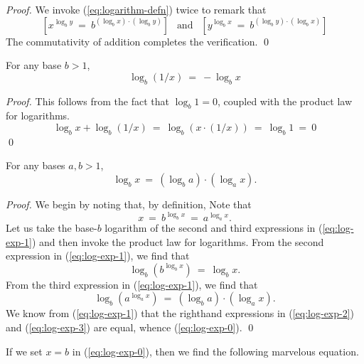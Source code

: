 \begin{proof}
We invoke (\ref{eq:logarithm-defn}) twice to remark that
\[ \left[x^{\log_b y} \ = \ b^{(\log_b x) \cdot (\log_b y)}\right]
\ \ \mbox{ and } \ \ 
\left[y^{\log_b x}\ = \ b^{(\log_b y) \cdot (\log_b x)}\right] \]
The commutativity of addition completes the verification.  \qed
\end{proof}

\begin{prop}
For any base $b >1$,
\[ \log_b (1/x) \ = \ - \log_b x \]
\end{prop}

\begin{proof}
This follows from the fact that $\log_b 1 =0$, coupled with the
product law for logarithms.
\[ \log_b x + \log_b (1/x) \ = \ \log_b (x \cdot (1/x))
\  = \ \log_b 1 \ = \ 0 
\]
\qed
\end{proof}

\begin{prop}
For any bases $a, b >1$,
\begin{equation}
\label{eq:log-exp-0}
\log_b x \ = \ \left(\log_b a \right) \cdot \left( \log_a x \right).
\end{equation}
\end{prop}

\begin{proof}
We begin by noting that, by definition,
Note that
\begin{equation}
\label{eq:log-exp-1}
 x \ = \ b^{\log_b x} \ = \ a^{\log_a x} .
\end{equation}
Let us take the base-$b$ logarithm of the second and third expressions
in (\ref{eq:log-exp-1}) and then invoke the product law for logarithms.
From the second expression in (\ref{eq:log-exp-1}), we find that
\begin{equation}
\label{eq:log-exp-2}
 \log_b \left(b^{\log_b x} \right) \ = \ \log_b x .
\end{equation}
From the third expression in (\ref{eq:log-exp-1}), we find that
\begin{equation}
\label{eq:log-exp-3}
 \log_b \left( a^{\log_a x} \right) \ = \
\left(\log_b a \right) \cdot \left( \log_a x \right).
\end{equation}
We know from (\ref{eq:log-exp-1}) that the righthand expressions in
(\ref{eq:log-exp-2}) and (\ref{eq:log-exp-3}) are equal, whence
(\ref{eq:log-exp-0}).   \qed
\end{proof}

If we set $x = b$ in (\ref{eq:log-exp-0}), then we find the following
marvelous equation.

